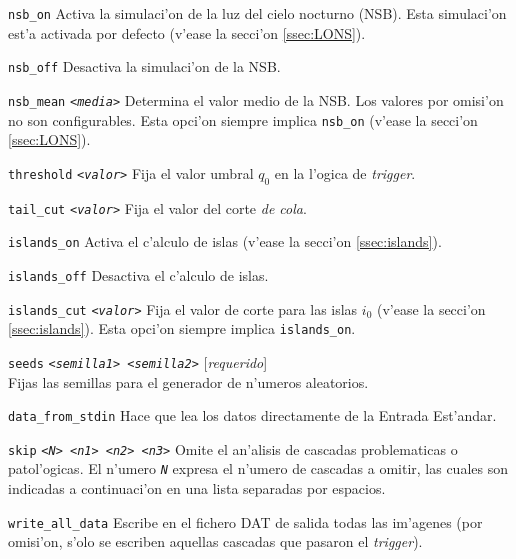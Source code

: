 \begin{Uentry}
\item[\texttt{nsb\_on}]
%
  Activa la simulaci'on de la luz del cielo nocturno (NSB).  Esta
  simulaci'on est'a activada por defecto (v'ease la secci'on
  \ref{ssec:LONS}).

\item[\texttt{nsb\_off}]
%
  Desactiva la simulaci'on de la NSB.

\item[\texttt{nsb\_mean} \quad
  \texttt{<\emph{media}>}]
%
  Determina el valor medio de la NSB.  Los valores por omisi'on no son
  configurables.  Esta opci'on siempre implica \texttt{nsb\_on}
  (v'ease la secci'on \ref{ssec:LONS}).

\item[\texttt{threshold} \quad
  \texttt{<\emph{valor}>}]
%
  Fija el valor umbral $q_0$ en la l'ogica de \emph{trigger}.

\item[\texttt{tail\_cut} \quad
  \texttt{<\emph{valor}>}]
%
  Fija el valor del corte \emph{de cola}.

\item[\texttt{islands\_on}]
%
  Activa el c'alculo de islas (v'ease la secci'on \ref{ssec:islands}).

\item[\texttt{islands\_off}]
%
  Desactiva el c'alculo de islas. 

\item[\texttt{islands\_cut} \quad
  \texttt{<\emph{valor}>}]
%
  Fija el valor de corte para las islas $i_0$ (v'ease la secci'on
  \ref{ssec:islands}).  Esta opci'on siempre implica
  \texttt{islands\_on}.

\item[\texttt{seeds} \quad
  \texttt{<\emph{semilla1}>  <\emph{semilla2}>}]
%
  [\emph{requerido}] \\
  Fijas las semillas para el generador de n'umeros aleatorios.

\item[\texttt{data\_from\_stdin}]
%
  Hace que \camera lea los datos directamente de la Entrada Est'andar.

\item[\texttt{skip} \quad
  \texttt{<\emph{N}>  <\emph{n1}>  <\emph{n2}>  <\emph{n3}>}]
%
  Omite el an'alisis de cascadas problematicas o patol'ogicas.  El
  n'umero \texttt{\emph{N}} expresa el n'umero de cascadas a omitir,
  las cuales son indicadas a continuaci'on en una lista separadas por
  espacios.

\item[\texttt{write\_all\_data}]
%
  Escribe en el fichero DAT de salida todas las im'agenes (por
  omisi'on, s'olo se escriben aquellas cascadas que pasaron el
  \emph{trigger}).


\end{Uentry}
